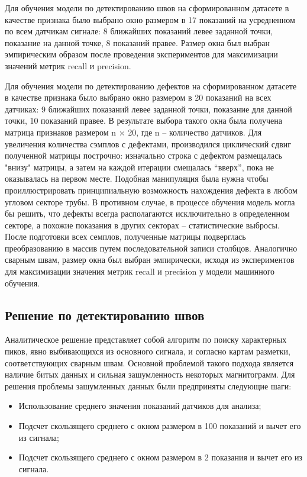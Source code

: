 \documentclass[a4paper,article,14pt]{extarticle}
\begin{document}
Для обучения модели по детектированию швов на сформированном датасете в качестве признака 
было выбрано окно размером в 17 показаний на усредненном по всем датчикам сигнале: 
8 ближайших показаний левее заданной точки, показание на данной точке, 8 показаний правее. 
Размер окна был выбран эмпирическим образом после проведения экспериментов для максимизации значений 
метрик recall и precision.

Для обучения модели по детектированию дефектов на сформированном датасете в качестве признака 
было выбрано окно размером в 20 показаний на всех датчиках: 9 ближайших показаний левее заданной точки, 
показание для данной точки, 10 показаний правее. В результате выбора такого окна была получена матрица 
признаков размером n × 20, где n – количество датчиков. Для увеличения количества сэмплов с дефектами, 
производился циклический сдвиг полученной матрицы построчно: изначально строка с дефектом размещалась "внизу" 
матрицы, а затем на каждой итерации смещалась “вверх”, пока не оказывалась на первом месте. Подобная манипуляция 
была нужна чтобы проиллюстрировать принципиальную возможность нахождения дефекта в любом угловом секторе трубы. 
В противном случае, в процессе обучения модель могла бы решить, что дефекты всегда располагаются исключительно 
в определенном секторе, а похожие показания в других секторах – статистические выбросы. После подготовки всех 
семплов, полученные матрицы подверглась преобразованию в массив путем последовательной записи столбцов. 
Аналогично сварным швам, размер окна был выбран эмпирически, исходя из экспериментов для максимизации значения 
метрик recall и precision у модели машинного обучения.

\subsection{Решение по детектированию швов}

Аналитическое решение представляет собой алгоритм по поиску характерных пиков, явно выбивающихся из основного сигнала, 
и согласно картам разметки, соответствующих сварным швам. Основной проблемой такого подхода является наличие битых 
данных и сильная зашумленность некоторых магнитограмм. Для решения проблемы зашумленных данных были предприняты 
следующие шаги: 

\begin{itemize}
    \item Использование среднего значения показаний датчиков для анализа;
    \item Подсчет скользящего среднего с окном размером в 100 показаний и вычет его из сигнала;
    \item Подсчет скользящего среднего с окном размером в 2 показания и вычет его из сигнала. 
\end{itemize}
\end{document}
